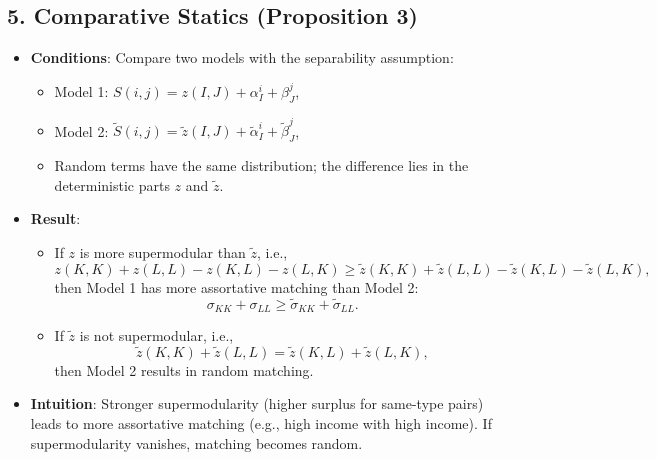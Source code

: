 \subsection*{5. Comparative Statics (Proposition 3)}
\begin{itemize}
    \item \textbf{Conditions}: Compare two models with the separability assumption:
    \begin{itemize}
        \item Model 1: \( S(i, j) = z(I, J) + \alpha_I^i + \beta_J^j \),
        \item Model 2: \( \tilde{S}(i, j) = \tilde{z}(I, J) + \tilde{\alpha}_I^i + \tilde{\beta}_J^j \),
        \item Random terms have the same distribution; the difference lies in the deterministic parts \( z \) and \( \tilde{z} \).
    \end{itemize}
    \item \textbf{Result}:
    \begin{itemize}
        \item If \( z \) is more supermodular than \( \tilde{z} \), i.e.,
        \[
        z(K,K) + z(L,L) - z(K,L) - z(L,K) \geq \tilde{z}(K,K) + \tilde{z}(L,L) - \tilde{z}(K,L) - \tilde{z}(L,K),
        \]
        then Model 1 has more assortative matching than Model 2:
        \[
        \sigma_{KK} + \sigma_{LL} \geq \tilde{\sigma}_{KK} + \tilde{\sigma}_{LL}.
        \]
        \item If \( \tilde{z} \) is not supermodular, i.e.,
        \[
        \tilde{z}(K,K) + \tilde{z}(L,L) = \tilde{z}(K,L) + \tilde{z}(L,K),
        \]
        then Model 2 results in random matching.
    \end{itemize}
    \item \textbf{Intuition}: Stronger supermodularity (higher surplus for same-type pairs) leads to more assortative matching (e.g., high income with high income). If supermodularity vanishes, matching becomes random.
\end{itemize}

